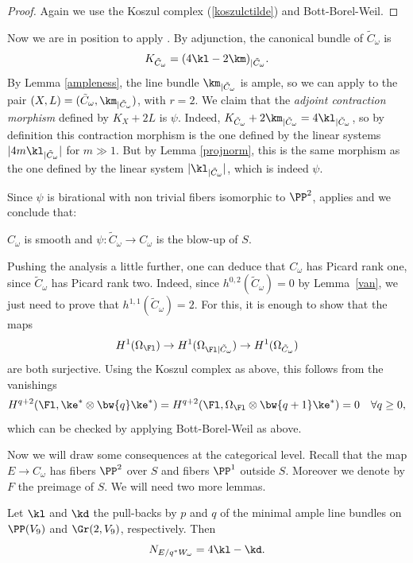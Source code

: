 \begin{proof}
Again we use the Koszul complex (\ref{koszulctilde}) and Bott-Borel-Weil.\end{proof}

Now we are in position to apply \cite{aw}. By adjunction, the
canonical bundle of $\tilde C_\omega$ is
\[
K_{\tilde C_\omega}=(4\kl-2\km)_{|\tilde C_\omega}.
\]
By Lemma \ref{ampleness}, the line bundle $\km_{|\tilde C_\omega}$ is ample, so we
can apply \cite[Th.\,4.1]{aw} to the pair $(X,L)=(\tilde C_\omega,\km_{|\tilde C_\omega})$,
with $r=2$. We claim that the {\it adjoint contraction morphism} defined by $K_X+2L$ is $\psi$.
Indeed, $K_{\tilde C_\omega}+2\km_{|\tilde C_\omega}=4\kl_{|\tilde C_\omega}$, so by definition
this contraction morphism is the one defined by the linear systems $|4m\kl_{|\tilde C_\omega}|$
for $m\gg1$. But by Lemma \ref{projnorm}, this is the same morphism as the one defined by the
linear system $|\kl_{|\tilde C_\omega}|$, which is indeed $\psi$.

Since $\psi$ is birational with non trivial fibers isomorphic to $\PP^2$, \cite[Th.\,4.1(iii)]{aw}
applies and we conclude that:\enlargethispage{-\baselineskip}%

\begin{prop}\label{blowupS}
$C_\omega$ is smooth and $\psi : \tilde C_\omega \to C_\omega$ is the blow-up of $S$.
\end{prop}

\begin{remark} Pushing the analysis a little further, one can deduce that $C_\omega$ has Picard rank one, since $\tilde C_\omega$ has Picard rank two. Indeed, since $h^{0,2}(\tilde C_\omega)=0$
by Lemma~\ref{van}, we just need to prove that $h^{1,1}(\tilde C_\omega)=2$.
For this, it is enough to show that the maps
\[
H^1(\Omega_{\Fl})\to H^1(\Omega_{{\Fl}|\tilde C_\omega})\to H^1(\Omega_{\tilde C_\omega})
\]
are both surjective. Using the Koszul complex as above, this follows from the vanishings
\[
H^{q+2}({\Fl}, \ke^*\otimes \bw{q}\ke^*)=H^{q+2}({\Fl}, \Omega_{\Fl}\otimes \bw{q+1}\ke^*)=0 \quad \forall q\ge 0,
\]
which can be checked by applying Bott-Borel-Weil as above.
\end{remark}

Now we will draw some consequences at the categorical level. Recall that the map $E\to C_\omega$
has fibers $\PP^2$ over $S$ and fibers $\PP^1$ outside $S$. Moreover we denote by $F$ the preimage
of $S$. We will need two more lemmas.

\begin{lemma}\label{normalE}
Let $\kl$ and $\kd$ the pull-backs by $p$ and $q$ of the minimal ample line bundles on $\PP(V_9)$ and $\Gr(2,V_9)$, respectively. Then
\[
N_{E/q^* W_\omega}=4\kl-\kd .
\]
\end{lemma}

